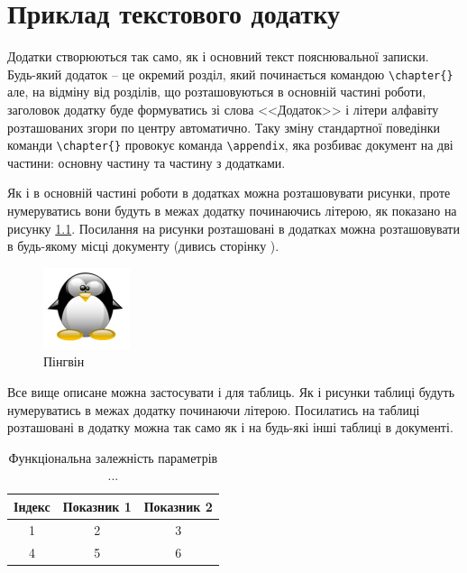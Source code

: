 \chapter[(Довідковий) Приклад текстового додатку]{Приклад текстового додатку}
\label{apdx:text}

Додатки створюються так само, як і основний текст пояснювальної записки. Будь-який додаток -- це окремий розділ, який
починається командою \verb|\chapter{}| але, на відміну від розділів, що розташовуються в основній частині роботи, заголовок
додатку буде формуватись зі слова <<Додаток>>  і літери алфавіту розташованих згори по центру автоматично. Таку зміну
стандартної поведінки команди \verb|\chapter{}| провокує команда \verb|\appendix|, яка розбиває документ на дві частини: 
основну частину та частину з додатками.


Як і в основній частині роботи в додатках можна розташовувати рисунки, проте нумеруватись вони будуть в межах додатку
починаючись літерою, як показано на рисунку \ref{apdxfig:tux}. Посилання на рисунки розташовані в додатках можна розташовувати 
в будь-якому місці документу (дивись сторінку \pageref{linkpage}).


\begin{figure}[h]
 \centering\includegraphics{img/Tux.png}
 \caption{Пінгвін}
 \label{apdxfig:tux}
\end{figure}

Все вище описане можна застосувати і для таблиць. Як і рисунки таблиці будуть нумеруватись в межах додатку починаючи літерою.
Посилатись на таблиці розташовані в додатку можна так само як і на будь-які інші таблиці в документі. 

\begin{table}[h]
\caption{\label{apdxtable:1}Функціональна залежність параметрів ...}
 \begin{tabular}{|c|c|c|}
 \hline 
 Індекс & Показник 1 & Показник 2\tabularnewline
 \hline\hline 
 1      & 2          & 3         \tabularnewline
 \hline
 4      & 5          & 6         \tabularnewline
 \hline 
\end{tabular}
\end{table}
  


